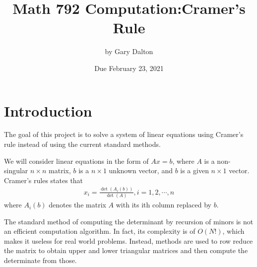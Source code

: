 \documentclass[12pt]{article}
\begin{document}
\title{Math 792 Computation:Cramer's Rule}
\author{by Gary Dalton}
\date{Due February 23, 2021}
\maketitle

\section*{Introduction}
The goal of this project is to solve a system of linear equations using Cramer's rule instead of using the current standard methods.

We will consider linear equations in the form of $Ax=b$, where $A$ is a non-singular $n\times n$ matrix, $b$ is a $n\times 1$ unknown vector, and $b$ is a given $n\times 1$ vector. Cramer's rules states that
\begin{align*}
	x_i = \frac{\det(A_i(b))}{\det(A)}, i=1,2,\cdots,n
\end{align*}
where $A_i(b)$ denotes the matrix $A$ with its ith column replaced by $b$.

The standard method of computing the determinant by recursion of minors is not an efficient computation algorithm. In fact, its complexity is of $O(N!)$, which makes it useless for real world problems. Instead, methods are used to row reduce the matrix to obtain upper and lower triangular matrices and then compute the determinate from those.
\end{document}
